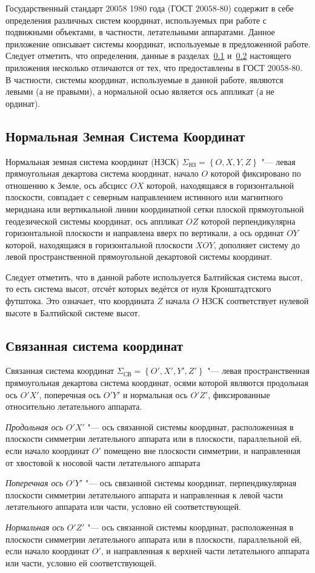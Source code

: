 \documentclass[../main.tex]{subfiles}
\begin{document}
Государственный стандарт $20058$ 1980 года (ГОСТ $20058$-$80$) содержит в себе определения различных систем координат, используемых при работе с подвижными объектами, в частности, летательными аппаратами. Данное приложение описывает системы координат, используемые в предложенной работе. Следует отметить, что определения, данные в разделах~\ref{sec:nzsk} и~\ref{sec:ssk} настоящего приложения несколько отличаются от тех, что предоставлены в ГОСТ $20058$-$80$. В частности, системы координат, используемые в данной работе, являются левыми (а не правыми), а нормальной осью является ось аппликат (а не ординат).

\subsection{Нормальная Земная Система Координат}\label{sec:nzsk}
Нормальная земная система координат (НЗСК) $\Sigma_{\text{НЗ}} = \left\{O, X, Y, Z\right\}$ "--- левая прямоугольная декартова система координат, начало $O$ которой фиксировано по отношению к Земле, ось абсцисс $OX$ которой, находящаяся в горизонтальной плоскости, совпадает с северным направлением истинного или магнитного меридиана или вертикальной линии координатной сетки плоской прямоугольной геодезической системы координат, ось аппликат $OZ$ которой перпендикулярна горизонтальной плоскости и направлена вверх по вертикали, а ось ординат $OY$ которой, находящаяся в горизонтальной плоскости $XOY$, дополняет систему до левой пространственной прямоугольной декартовой системы координат.

Следует отметить, что в данной работе используется Балтийская система высот, то есть система высот, отсчёт которых ведётся от нуля Кронштадтского футштока. Это означает, что координата $Z$ начала $O$ НЗСК соответствует нулевой высоте в Балтийской системе высот.

\subsection{Связанная система координат}\label{sec:ssk}
Связанная система координат $\Sigma_{\text{СВ}} = \left\{O', X', Y', Z'\right\}$ "--- левая пространственная прямоугольная декартова система координат, осями которой являются продольная ось $O'X'$, поперечная ось $O'Y'$ и нормальная ось $O'Z'$, фиксированные относительно летательного аппарата.

\textit{Продольная ось} $O'X'$ "--- ось связанной системы координат, расположенная в плоскости симметрии летательного аппарата или в плоскости, параллельной ей, если начало координат $O'$ помещено вне плоскости симметрии, и направленная от хвостовой к носовой части летательного аппарата

\textit{Поперечная ось} $O'Y'$ "--- ось связанной системы координат, перпендикулярная плоскости симметрии летательного аппарата и направленная к левой части летательного аппарата или части, условно ей соответствующей.

\textit{Нормальная ось} $O'Z'$ "--- ось связанной системы координат, расположенная в плоскости симметрии летательного аппарата или в плоскости, параллельной ей, если начало координат $O'$, и направленная к верхней части летательного аппарата или части, условно ей соответствующей.
\end{document}
